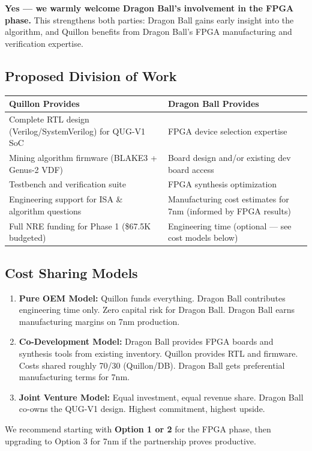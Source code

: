 \documentclass[11pt,a4paper]{article}
\begin{document}
\textbf{Yes --- we warmly welcome Dragon Ball's involvement in the FPGA phase.} This strengthens both parties: Dragon Ball gains early insight into the algorithm, and Quillon benefits from Dragon Ball's FPGA manufacturing and verification expertise.

\subsection{Proposed Division of Work}

\begin{center}
\begin{tabular}{@{}p{7cm}p{7cm}@{}}
\toprule
\textbf{Quillon Provides} & \textbf{Dragon Ball Provides} \\
\midrule
Complete RTL design (Verilog/SystemVerilog) for QUG-V1 SoC & FPGA device selection expertise \\[4pt]
Mining algorithm firmware (BLAKE3 + Genus-2 VDF) & Board design and/or existing dev board access \\[4pt]
Testbench and verification suite & FPGA synthesis optimization \\[4pt]
Engineering support for ISA \& algorithm questions & Manufacturing cost estimates for 7nm (informed by FPGA results) \\[4pt]
Full NRE funding for Phase 1 (\$67.5K budgeted) & Engineering time (optional --- see cost models below) \\
\bottomrule
\end{tabular}
\end{center}

\subsection{Cost Sharing Models}

\begin{greeninsight}
\begin{enumerate}[leftmargin=1.5em]
    \item \textbf{Pure OEM Model:} Quillon funds everything. Dragon Ball contributes engineering time only. Zero capital risk for Dragon Ball. Dragon Ball earns manufacturing margins on 7nm production.

    \item \textbf{Co-Development Model:} Dragon Ball provides FPGA boards and synthesis tools from existing inventory. Quillon provides RTL and firmware. Costs shared roughly 70/30 (Quillon/DB). Dragon Ball gets preferential manufacturing terms for 7nm.

    \item \textbf{Joint Venture Model:} Equal investment, equal revenue share. Dragon Ball co-owns the QUG-V1 design. Highest commitment, highest upside.
\end{enumerate}
We recommend starting with \textbf{Option 1 or 2} for the FPGA phase, then upgrading to Option 3 for 7nm if the partnership proves productive.
\end{greeninsight}
\end{document}
